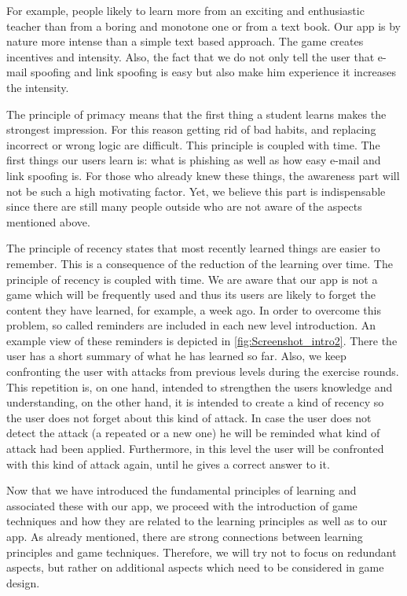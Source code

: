 \begin{description}[leftmargin=0cm]
For example, people likely to learn more from an exciting and enthusiastic teacher than from a boring and monotone one or from a text book.
Our app is by nature more intense than a simple text based approach.
The game creates incentives and intensity.
Also, the fact that we do not only tell the user that e-mail spoofing and link spoofing is easy but also make him experience it increases the intensity.
	\item[Primacy:] The principle of primacy means that the first thing a student learns makes the strongest impression. 
For this reason getting rid of bad habits, and replacing incorrect or wrong logic are difficult. 
This principle is coupled with time. 
The first things our users learn is: what is phishing as well as how easy e-mail and link spoofing is. 
For those who already knew these things, the awareness part will not be such a high motivating factor. 
Yet, we believe this part is indispensable since there are still many people outside who are not aware of the aspects mentioned above. 
	\item[Recency:] The principle of recency states that most recently learned things are easier to remember. 
This is a consequence of the reduction of the learning over time. 
The principle of recency is coupled with time. 
We are aware that our app is not a game which will be frequently used and thus its users are likely to forget the content they have learned, for example, a week ago. 
In order to overcome this problem, so called reminders are included in each new level introduction.
An example view of these reminders is depicted in \autoref{fig:Screenshot_intro2}. 
There the user has a short summary of what he has learned so far. 
Also, we keep confronting the user with attacks from previous levels during the exercise rounds.
This repetition is, on one hand, intended to strengthen the users knowledge and understanding, on the other hand, it is intended to create a kind of recency so the user does not forget about this kind of attack. 
In case the user does not detect the attack (a repeated or a new one) he will be reminded what kind of attack had been applied. 
Furthermore, in this level the user will be confronted with this kind of attack again, until he gives a correct answer to it.
\end{description}
Now that we have introduced the fundamental principles of learning and associated these with our app, we proceed with the introduction of game techniques and how they are related to the learning principles as well as to our app. 
As already mentioned, there are strong connections between learning principles and game techniques. 
Therefore, we will try not to focus on redundant aspects, but rather on additional aspects which need to be considered in game design. 

